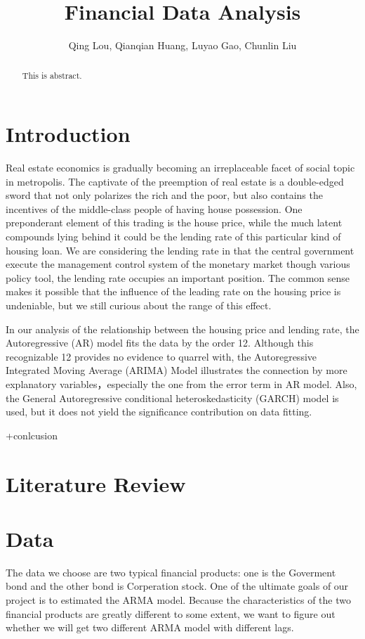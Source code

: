 \documentclass[12pt,letterpaper]{article}
\begin{document}
\title{\textbf{\Large Financial Data Analysis}}
\author{Qing Lou, Qianqian Huang, Luyao Gao, Chunlin Liu}
\date{}
\maketiitle 

\thispagestyle{empty}
\tableofcontents
\newpage
\clearpage

\begin{abstract}
This is abstract.
\end{abstract}

\section{Introduction}

Real estate economics is gradually becoming an irreplaceable facet of social topic in metropolis. 
The captivate of the preemption of real estate is a double-edged sword that not only polarizes the rich and the poor, but also contains the incentives of the middle-class people of having house possession.
One preponderant element of this trading is the house price, while the much latent compounds lying behind it could be the lending rate of this particular kind of housing loan.
We are considering the lending rate in that the central government execute the management control system of the monetary market though various policy tool, the lending rate occupies an important position.
The common sense makes it possible that the influence of the leading rate on the housing price is undeniable, but we still curious about the range of this effect.

In our analysis of the relationship between the housing price and lending rate, the Autoregressive (AR) model fits the data by the order 12. 
Although this recognizable 12 provides no evidence to quarrel with, the Autoregressive Integrated Moving Average (ARIMA) Model illustrates the connection by more explanatory variables，especially the one from the error term in AR model.
Also, the General Autoregressive conditional heteroskedasticity (GARCH) model is used, but it does not yield the significance contribution on data fitting.

+conlcusion

\section{Literature Review}

\section{Data}
         The data we choose are two typical financial products: one is the Goverment bond and 
         the other bond is Corperation stock. One of the ultimate goals of our project is to 
         estimated the ARMA model. Because the characteristics of the two financial products 
         are greatly different to some extent, we want to figure out whether we will get two 
         different ARMA model with different lags.
         
\end{document}
